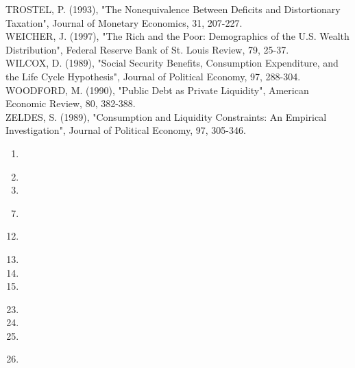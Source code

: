 \documentclass[11pt]{article}
\begin{document}
TROSTEL, P. (1993), "The Nonequivalence Between Deficits and Distortionary Taxation", Journal of Monetary Economics, 31, 207-227.\\
WEICHER, J. (1997), "The Rich and the Poor: Demographics of the U.S. Wealth Distribution", Federal Reserve Bank of St. Louis Review, 79, 25-37.\\
WILCOX, D. (1989), "Social Security Benefits, Consumption Expenditure, and the Life Cycle Hypothesis", Journal of Political Economy, 97, 288-304.\\
WOODFORD, M. (1990), "Public Debt as Private Liquidity", American Economic Review, 80, 382-388.\\
ZELDES, S. (1989), "Consumption and Liquidity Constraints: An Empirical Investigation", Journal of Political Economy, 97, 305-346.

\begin{enumerate}
  \item 
\end{enumerate}

\begin{enumerate}
  \setcounter{enumi}{1}
  \item 
  \item 
\end{enumerate}

\begin{enumerate}
  \setcounter{enumi}{6}
  \item 
\end{enumerate}

\begin{enumerate}
  \setcounter{enumi}{11}
  \item 
\end{enumerate}

\begin{enumerate}
  \setcounter{enumi}{12}
  \item 
  \item 
  \item 
\end{enumerate}

\begin{enumerate}
  \setcounter{enumi}{22}
  \item 
  \item 
  \item 
\end{enumerate}

\begin{enumerate}
  \setcounter{enumi}{25}
  \item 
\end{enumerate}
\end{document}
